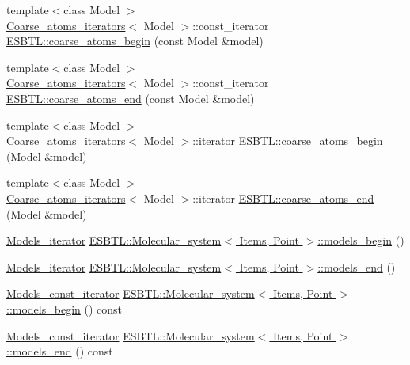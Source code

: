 \begin{DoxyCompactItemize}
\item 
{\footnotesize template$<$class Model $>$ }\\\hyperlink{structESBTL_1_1Coarse__atoms__iterators}{Coarse\+\_\+atoms\+\_\+iterators}$<$ Model $>$\+::const\+\_\+iterator \hyperlink{group__grp__iters_gabf07aacb61d906d9cb002b2e585e4eb8}{E\+S\+B\+T\+L\+::coarse\+\_\+atoms\+\_\+begin} (const Model \&model)
\item 
{\footnotesize template$<$class Model $>$ }\\\hyperlink{structESBTL_1_1Coarse__atoms__iterators}{Coarse\+\_\+atoms\+\_\+iterators}$<$ Model $>$\+::const\+\_\+iterator \hyperlink{group__grp__iters_gaa526c599e8abd3960e6b16ec2c6ed522}{E\+S\+B\+T\+L\+::coarse\+\_\+atoms\+\_\+end} (const Model \&model)
\item 
{\footnotesize template$<$class Model $>$ }\\\hyperlink{structESBTL_1_1Coarse__atoms__iterators}{Coarse\+\_\+atoms\+\_\+iterators}$<$ Model $>$\+::iterator \hyperlink{group__grp__iters_ga44b38b942148d622332c4d9d2b483c84}{E\+S\+B\+T\+L\+::coarse\+\_\+atoms\+\_\+begin} (Model \&model)
\item 
{\footnotesize template$<$class Model $>$ }\\\hyperlink{structESBTL_1_1Coarse__atoms__iterators}{Coarse\+\_\+atoms\+\_\+iterators}$<$ Model $>$\+::iterator \hyperlink{group__grp__iters_ga1336e327e3310a72197278ab5b5017b0}{E\+S\+B\+T\+L\+::coarse\+\_\+atoms\+\_\+end} (Model \&model)
\item 
\hyperlink{group__grp__iters_ga752760df14baf1b92dac469d712202bc}{Models\+\_\+iterator} \hyperlink{group__grp__iters_gaed42cb1b0c025e5a74b231384dfe1632}{E\+S\+B\+T\+L\+::\+Molecular\+\_\+system$<$ Items, Point $>$\+::models\+\_\+begin} ()
\item 
\hyperlink{group__grp__iters_ga752760df14baf1b92dac469d712202bc}{Models\+\_\+iterator} \hyperlink{group__grp__iters_ga16244782639e3a6183da4a722162d534}{E\+S\+B\+T\+L\+::\+Molecular\+\_\+system$<$ Items, Point $>$\+::models\+\_\+end} ()
\item 
\hyperlink{group__grp__iters_ga6383c53b86af7a7a7376bce06e4febb8}{Models\+\_\+const\+\_\+iterator} \hyperlink{group__grp__iters_gae69a995db286b769fe7a8ae57658eb17}{E\+S\+B\+T\+L\+::\+Molecular\+\_\+system$<$ Items, Point $>$\+::models\+\_\+begin} () const
\item 
\hyperlink{group__grp__iters_ga6383c53b86af7a7a7376bce06e4febb8}{Models\+\_\+const\+\_\+iterator} \hyperlink{group__grp__iters_gab880e831a7b87fafec9ddf2e569b4cba}{E\+S\+B\+T\+L\+::\+Molecular\+\_\+system$<$ Items, Point $>$\+::models\+\_\+end} () const

\end{DoxyCompactItemize}
